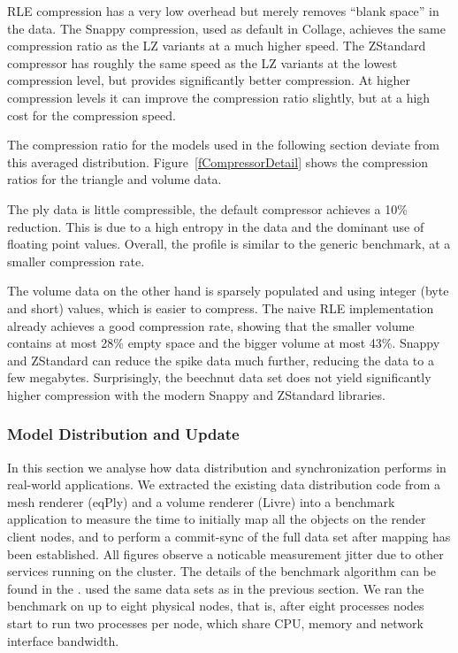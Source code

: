 \documentclass[10pt,journal,compsoc]{IEEEtran}
\newcommand{\fig}[1]{Figure~\ref{#1}}
\begin{document}
RLE compression has a very low overhead but merely removes ``blank space'' in
the data. The Snappy compression, used as default in \textsf{Collage}, achieves
the same compression ratio as the LZ variants at a much higher speed. The
ZStandard compressor has roughly the same speed as the LZ variants at the lowest
compression level, but provides significantly better compression. At higher
compression levels it can improve the compression ratio slightly, but at a high
cost for the compression speed.

The compression ratio for the models used in the following section deviate from
this averaged distribution. \fig{fCompressorDetail} shows the compression ratios
for the triangle and volume data.

The ply data is little compressible, the default compressor achieves a 10\%
reduction. This is due to a high entropy in the data and the dominant use of
floating point values. Overall, the profile is similar to the generic benchmark,
at a smaller compression rate.

The volume data on the other hand is sparsely populated and using integer (byte
and short) values, which is easier to compress. The naive RLE implementation
already achieves a good compression rate, showing that the smaller volume contains at
most 28\% empty space and the bigger volume at most 43\%. Snappy and ZStandard
can reduce the spike data much further, reducing the data to a few megabytes.
Surprisingly, the beechnut data set does not yield significantly higher
compression with the modern Snappy and ZStandard libraries.


\subsubsection{Model Distribution and Update}

In this section we analyse how data distribution and synchronization performs in
real-world applications. We extracted the existing data distribution code from a
mesh renderer (eqPly) and a volume renderer (Livre) into a benchmark application
to measure the time to initially map all the objects on the render client nodes,
and to perform a commit-sync of the full data set after mapping has been
established. All figures observe a noticable measurement jitter due to other
services running on the cluster. The details of the benchmark algorithm can be
found in the
.
used the same data sets as in the previous section. We ran the benchmark on up
to eight physical nodes, that is, after eight processes nodes start to run two
processes per node, which share CPU, memory and network interface bandwidth.
\end{document}
